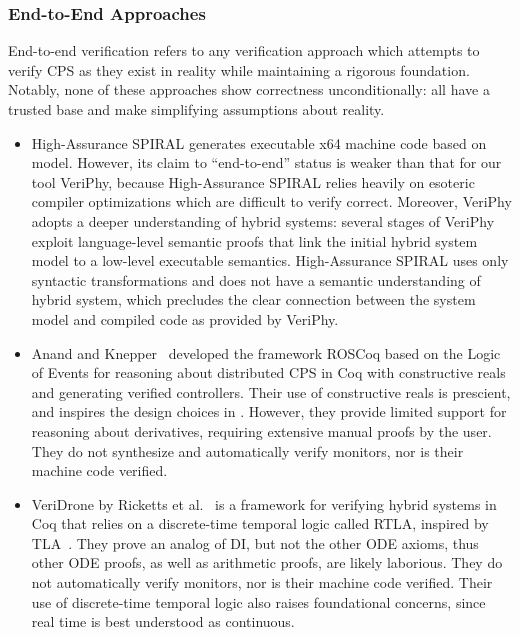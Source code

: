 \documentclass[12pt]{cmuthesis}
\theoremstyle{definition}
\theoremstyle{remark}
\newcommand{\rref}[2][]{\prettyref{#2}}
\newcommand{\VeriPhy}{VeriPhy\xspace}
\begin{document}
\subsubsection{End-to-End Approaches}
End-to-end verification refers to any verification approach which attempts to verify CPS as they exist in reality while maintaining a rigorous foundation.
Notably, none of these approaches show correctness unconditionally: all have a trusted base and make simplifying assumptions about reality.
\begin{itemize}
\item
  High-Assurance SPIRAL \cite{DBLP:journals/csm/FranchettiLMMGPPKMFJPV17} generates executable x64 machine code based on \dL model.
  However, its claim to ``end-to-end'' status is weaker than that for our tool \VeriPhy, because High-Assurance SPIRAL relies heavily on esoteric compiler optimizations which are difficult to verify correct.
  Moreover, \VeriPhy adopts a deeper understanding of hybrid systems: several stages of \VeriPhy exploit language-level semantic proofs that link the initial hybrid system model to a low-level executable semantics.
  High-Assurance SPIRAL uses only syntactic transformations and does not have a semantic understanding of hybrid system, which precludes the clear connection between the system model and compiled code as provided by \VeriPhy.
\item 
Anand and Knepper~\cite{DBLP:conf/itp/AnandK15} developed the framework ROSCoq based on the Logic of Events for reasoning about distributed CPS in Coq with constructive reals and generating verified controllers.
Their use of constructive reals is prescient, and inspires the design choices in \rref{ch:proofplex}.
However, they provide limited support for reasoning about derivatives, requiring extensive manual proofs by the user.
They do not synthesize and automatically verify monitors, nor is their machine code verified.
\item 
VeriDrone by Ricketts et al.~\cite{Ricketts:memcode:2015} is a framework for verifying hybrid systems in Coq that relies on a discrete-time temporal logic called RTLA, inspired by TLA~\cite{Lamport:hybrid:1992}.
They prove an analog of DI, but not the other ODE axioms, thus other ODE proofs, as well as arithmetic proofs, are likely laborious.
They do not automatically verify monitors, nor is their machine code verified.
Their use of discrete-time temporal logic also raises foundational concerns, since real time is best understood as continuous.
\end{itemize}
\end{document}
